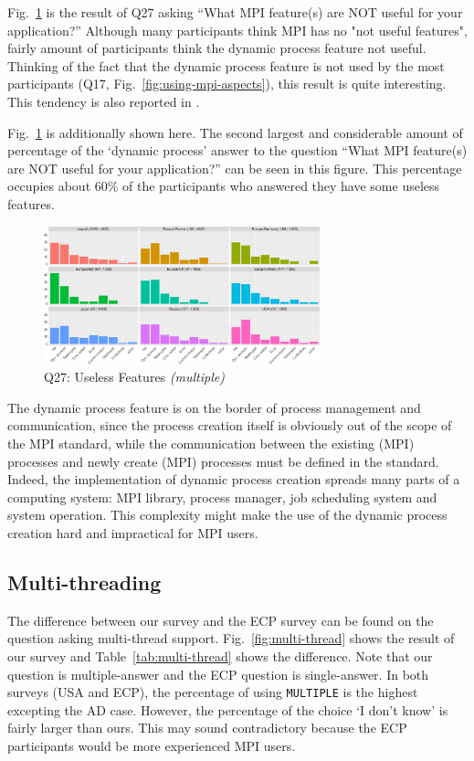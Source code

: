 \documentclass[conference,10pt,letterpaper]{IEEEtran}
\def\myquote#1{`#1'}
\begin{document}
Fig.~\ref{fig:useless-features} is the result of Q27 asking ``What MPI
feature(s) are NOT useful for your application?'' Although many
participants think MPI has no "not useful features", fairly amount of
participants think the dynamic process feature not useful. Thinking
of the fact that the dynamic process feature is not used by the most
participants (Q17, Fig.~\ref{fig:using-mpi-aspects}), this result is
quite interesting.
This tendency is also reported in \cite{10.1145/3295500.3356176}.

Fig.~\ref{fig:useless-features} is additionally shown here. The second
largest and considerable amount of percentage of the \myquote{dynamic
  process} answer to the question ``What MPI feature(s) are NOT useful
for your application?'' can be seen in this figure. This percentage
occupies about 60\% of the participants who answered they have
some useless features.

\begin{figure}[htb]
\begin{center}
\includegraphics[width=8cm]{R-scripts/Q27.pdf}
\caption{Q27: Useless Features {\it(multiple)}}
\label{fig:useless-features}
\end{center}
\end{figure}

The dynamic process feature is on the
border of process management and communication, since the process
creation itself is obviously out of the scope of the MPI standard,
while the communication between the existing (MPI) processes and newly
create (MPI) processes must be defined in the standard. Indeed, the
implementation of dynamic process creation spreads many parts of a
computing system: MPI library, process manager, job scheduling system
and system operation. This complexity might make the use of the
dynamic process creation hard and impractical for MPI users. 

\subsection{Multi-threading}

The difference between our survey and the ECP survey can be found on
the question asking multi-thread support. Fig.~\ref{fig:multi-thread}
shows the result of our survey and Table~\ref{tab:multi-thread} shows
the difference. Note that our question is multiple-answer and the ECP
question is single-answer. In both surveys (USA and ECP), the
percentage of using {\tt MULTIPLE} is the highest excepting the AD
case. However, the percentage of the choice \myquote{I don't know}
is fairly larger than ours. This may sound contradictory because the
ECP participants would be more experienced MPI users.
\end{document}

